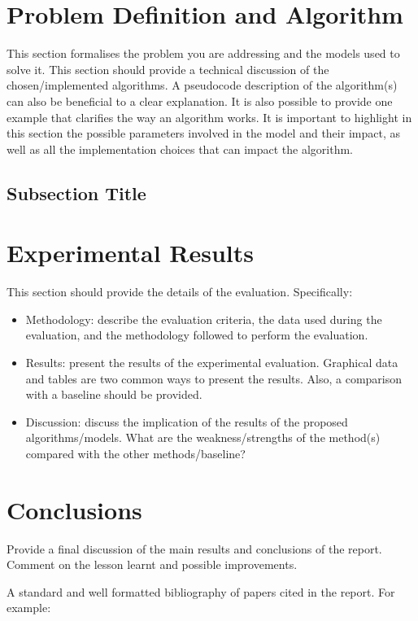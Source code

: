 \documentclass{svproc}
\begin{document}
    \section{Problem Definition and Algorithm}
    This section formalises the problem you are addressing and the models used to solve it. This section should provide a technical discussion of the chosen/implemented algorithms. A pseudocode description of the algorithm(s) can also be beneficial to a clear explanation. It is also possible to provide one example that clarifies the way an algorithm works. It is important to highlight in this section the possible parameters involved in the model and their impact, as well as all the implementation choices that can impact the algorithm.

    \subsection{Subsection Title}

    \section{Experimental Results}
    This section should provide the details of the evaluation. Specifically:
    \begin{itemize}
        \item Methodology: describe the evaluation criteria, the data used during the evaluation, and the methodology followed to perform the evaluation.
        \item Results: present the results of the experimental evaluation. Graphical data and tables are two common ways to present the results. Also, a comparison with a baseline should be provided.
        \item Discussion: discuss the implication of the results of the proposed algorithms/models. What are the weakness/strengths of the method(s) compared with the other methods/baseline?
    \end{itemize}

    \section{Conclusions}
    Provide a final discussion of the main results and conclusions of the report. Comment on the lesson learnt and possible improvements.


    A standard\cite{test1} and well formatted bibliography of papers cited in the report. For example\cite{test2}:

    
    
\end{document}
